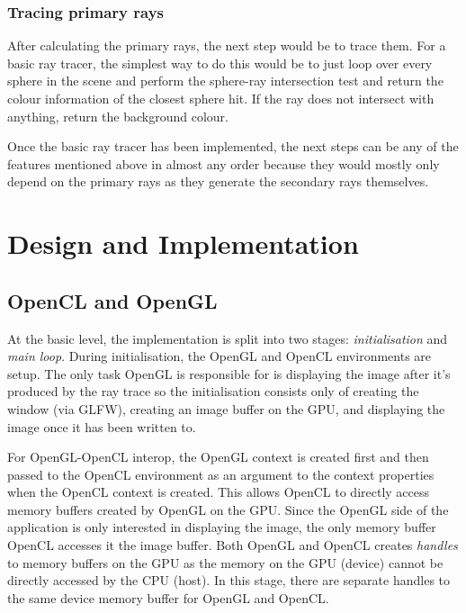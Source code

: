\documentclass[final]{cmpreport}
\begin{document}
\subsubsection{Tracing primary rays}
After calculating the primary rays, the next step would be to trace them. For a basic ray tracer, the simplest way to do this would be to just loop over every sphere in the scene and perform the sphere-ray intersection test and return the colour information of the closest sphere hit. If the ray does not intersect with anything, return the background colour.

Once the basic ray tracer has been implemented, the next steps can be any of the features mentioned above in almost any order because they would mostly only depend on the primary rays as they generate the secondary rays themselves.

\section{Design and Implementation}

\subsection{OpenCL and OpenGL}

At the basic level, the implementation is split into two stages: \textit{initialisation} and \textit{main loop}. During initialisation, the OpenGL and OpenCL environments are setup. The only task OpenGL is responsible for is displaying the image after it's produced by the ray trace so the initialisation consists only of creating the window (via GLFW), creating an image buffer on the GPU, and displaying the image once it has been written to.

For OpenGL-OpenCL interop, the OpenGL context is created first and then passed to the OpenCL environment as an argument to the context properties when the OpenCL context is created. This allows OpenCL to directly access memory buffers created by OpenGL on the GPU. Since the OpenGL side of the application is only interested in displaying the image, the only memory buffer OpenCL accesses it the image buffer. Both OpenGL and OpenCL creates \textit{handles} to memory buffers on the GPU as the memory on the GPU (device) cannot be directly accessed by the CPU (host). In this stage, there are separate handles to the same device memory buffer for OpenGL and OpenCL.
\end{document}
